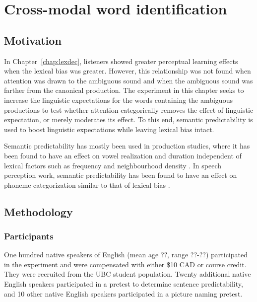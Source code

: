 
\chapter{Cross-modal word identification}
\label{chap:sent}


\section{Motivation}

In Chapter~\ref{chap:lexdec}, listeners showed greater perceptual learning effects when the lexical bias was greater.  However, this relationship was not found when attention was drawn to the ambiguous sound and when the ambiguous sound was farther from the canonical production.  The experiment in this chapter seeks to increase the linguistic expectations for the words containing the ambiguous productions to test whether attention categorically removes the effect of linguistic expectation, or merely moderates its effect.  To this end, semantic predictability is used to boost linguistic expectations while leaving lexical bias intact.

Semantic predictability has mostly been used in production studies, where it has been found to have an effect on vowel realization and duration independent of lexical factors such as frequency and neighbourhood density \citep{Scarborough2010, Clopper2008}.  In speech perception work, semantic predictability has been found to have an effect on phoneme categorization similar to that of lexical bias \citep{Borsky1998}.

\section{Methodology}

\subsection{Participants}

One hundred native speakers of English (mean age ??, range ??-??) participated in the experiment and were compensated with either \$10 CAD or course credit. 
They were recruited from the UBC student population.  
Twenty additional native English speakers participated in a pretest to determine sentence predictability, and 10 other native English speakers participated in a picture naming pretest.

